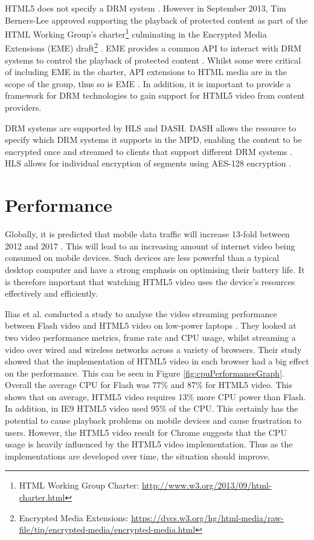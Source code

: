 \documentclass[journal]{IEEEtran}
\begin{document}
HTML5 does not specify a DRM system \cite{article:HTML5LeadsAWebRevolution}. However in September 2013, Tim Berners-Lee approved supporting the playback of protected content as part of the HTML Working Group's charter\footnote{HTML Working Group Charter: \url{http://www.w3.org/2013/09/html-charter.html}} culminating in the Encrypted Media Extensions (EME) draft\footnote{Encrypted Media Extensions: \url{https://dvcs.w3.org/hg/html-media/raw-file/tip/encrypted-media/encrypted-media.html}} \cite{email:newHTMLCharter}. EME provides a common API to interact with DRM systems to control the playback of protected content \cite{standard:eme}. Whilst some were critical of including EME in the charter, API extensions to HTML media are in the scope of the group, thus so is EME \cite{website:EEFDRM}\cite{email:emeInScope}. In addition, it is important to provide a framework for DRM technologies to gain support for HTML5 video from content providers.

DRM systems are supported by HLS and DASH. DASH allows the resource to specify which DRM systems it supports in the MPD, enabling the content to be encrypted once and streamed to clients that support different DRM systems \cite{article:MPEGDASH}. HLS allows for individual encryption of segments using AES-128 encryption \cite{techreport:aReviewOfHTTPLiveStreaming}.

\section{Performance}
Globally, it is predicted that mobile data traffic will increase 13-fold between 2012 and 2017 \cite{website:ciscoForecastAndMethodology}. This will lead to an increasing amount of internet video being consumed on mobile devices. Such devices are less powerful than a typical desktop computer and  have a strong emphasis on optimising their battery life. It is therefore important that watching HTML5 video uses the device's resources effectively and efficiently. %

Ilias et al. conducted a study to analyse the video streaming performance between Flash video and HTML5 video on low-power laptops \cite{inproceedings:aStudyOfVideoPerformanceAnalysis}. They looked at two video performance metrics, frame rate and CPU usage, whilst streaming a video over wired and wireless networks across a variety of browsers. Their study showed that the implementation of HTML5 video in each browser had a big effect on the performance. This can be seen in Figure \ref{fig:cpuPerformanceGraph}. Overall the average CPU for Flash was 77\% and 87\% for HTML5 video. This shows that on average, HTML5 video requires 13\% more CPU power than Flash. In addition, in IE9 HTML5 video used 95\% of the CPU. This certainly has the potential to cause playback problems on mobile devices and cause frustration to users. However, the HTML5 video result for Chrome suggests that the CPU usage is heavily influenced by the HTML5 video implementation. Thus as the implementations are developed over time, the situation should improve.
\end{document}
